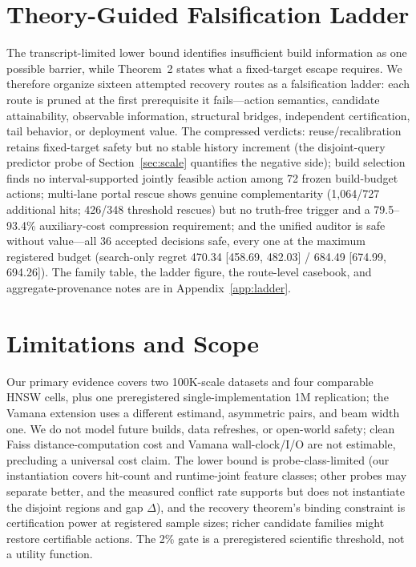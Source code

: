\documentclass{article}
\begin{document}
\section{Theory-Guided Falsification Ladder}
\label{sec:ladder}

The transcript-limited lower bound identifies insufficient build information as one possible barrier, while
Theorem~2 states what a fixed-target escape requires. We therefore organize sixteen attempted recovery
routes as a falsification ladder: each route is pruned at the first prerequisite it fails---action
semantics, candidate attainability, observable information, structural bridges, independent certification,
tail behavior, or deployment value. The compressed verdicts: reuse/recalibration retains fixed-target
safety but no stable history increment (the disjoint-query predictor probe of Section~\ref{sec:scale}
quantifies the negative side); build selection finds no interval-supported jointly feasible action among 72
frozen build-budget actions; multi-lane portal rescue shows genuine complementarity (1{,}064/727 additional
hits; 426/348 threshold rescues) but no truth-free trigger and a 79.5--93.4\% auxiliary-cost compression
requirement; and the unified auditor is safe without value---all 36 accepted decisions safe, every one at
the maximum registered budget (search-only regret 470.34 [458.69, 482.03] / 684.49 [674.99, 694.26]). The
family table, the ladder figure, the route-level casebook, and aggregate-provenance notes are in
Appendix~\ref{app:ladder}.

\section{Limitations and Scope}
\label{sec:limitations}

Our primary evidence covers two 100K-scale datasets and four comparable HNSW cells, plus one
preregistered single-implementation 1M replication; the Vamana extension uses a different estimand,
asymmetric pairs, and beam width one. We do not model future builds, data refreshes, or open-world safety;
clean Faiss distance-computation cost and Vamana wall-clock/I/O are not estimable, precluding a universal
cost claim. The lower bound is probe-class-limited (our instantiation covers hit-count and runtime-joint
feature classes; other probes may separate better, and the measured conflict rate supports but does not
instantiate the disjoint regions and gap $\Delta$), and the recovery theorem's binding constraint is
certification power at registered sample sizes; richer candidate families might restore certifiable
actions. The 2\% gate is a preregistered scientific threshold, not a utility function.
\end{document}
